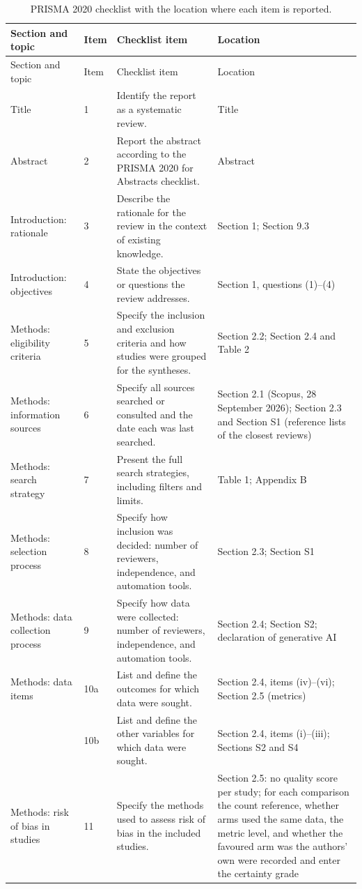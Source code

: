 \documentclass[a4paper,11pt]{article}
\begin{document}
\begin{footnotesize}
\setlength{\tabcolsep}{3pt}
\begin{longtable}{@{}L{3.0cm}L{0.8cm}L{6.4cm}L{5.6cm}@{}}
\caption{PRISMA 2020 checklist with the location where each item is reported.}\label{tab:prisma}\\
\toprule
Section and topic & Item & Checklist item & Location\\
\midrule
\endfirsthead
\toprule
Section and topic & Item & Checklist item & Location\\
\midrule
\endhead
\bottomrule
\endfoot
Title & 1 & Identify the report as a systematic review. & Title\\
Abstract & 2 & Report the abstract according to the PRISMA 2020 for Abstracts checklist. & Abstract\\
Introduction: rationale & 3 & Describe the rationale for the review in the context of existing knowledge. & Section 1; Section 9.3\\
Introduction: objectives & 4 & State the objectives or questions the review addresses. & Section 1, questions (1)--(4)\\
Methods: eligibility criteria & 5 & Specify the inclusion and exclusion criteria and how studies were grouped for the syntheses. & Section 2.2; Section 2.4 and Table 2\\
Methods: information sources & 6 & Specify all sources searched or consulted and the date each was last searched. & Section 2.1 (Scopus, 28 September 2026); Section 2.3 and Section S1 (reference lists of the closest reviews)\\
Methods: search strategy & 7 & Present the full search strategies, including filters and limits. & Table 1; Appendix B\\
Methods: selection process & 8 & Specify how inclusion was decided: number of reviewers, independence, and automation tools. & Section 2.3; Section S1\\
Methods: data collection process & 9 & Specify how data were collected: number of reviewers, independence, and automation tools. & Section 2.4; Section S2; declaration of generative AI\\
Methods: data items & 10a & List and define the outcomes for which data were sought. & Section 2.4, items (iv)--(vi); Section 2.5 (metrics)\\
 & 10b & List and define the other variables for which data were sought. & Section 2.4, items (i)--(iii); Sections S2 and S4\\
Methods: risk of bias in studies & 11 & Specify the methods used to assess risk of bias in the included studies. & Section 2.5: no quality score per study; for each comparison the count reference, whether arms used the same data, the metric level, and whether the favoured arm was the authors' own were recorded and enter the certainty grade\\

\end{longtable}
\end{footnotesize}
\end{document}
